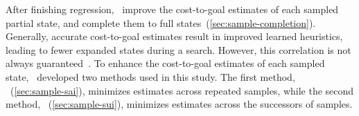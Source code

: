 \documentclass[ppgc,diss,english]{iiufrgs}
\begin{document}
After finishing regression,~\citet{Bettker.etal/2022} improve the cost-to-goal estimates of each sampled partial state, and complete them to full states~(\cref{sec:sample-completion}).
Generally, accurate cost-to-goal estimates result in improved learned heuristics, leading to fewer expanded states during a search. However, this correlation is not always guaranteed~\cite{Holte/2010}. To enhance the cost-to-goal estimates of each sampled state,~\citet{Bettker.etal/2022} developed two methods used in this study. The first method, \sai~(\cref{sec:sample-sai}), minimizes estimates across repeated samples, while the second method, \sui~(\cref{sec:sample-sui}), minimizes estimates across the successors of samples.

%

\end{document}
